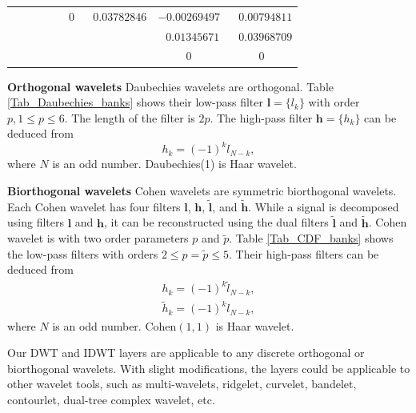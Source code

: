 \begin{table}
\begin{center}
{\begin{tabular}{c|cc|cc|cc|cc}
			&              &                      &              &                      &       $0$       &   $~~~0.03782846$    &  $-0.00269497$  &   $~~~0.00794811$    \\
			&              &                      &              &                      &                 &                      & $~~~0.01345671$ &   $~~~0.03968709$    \\
			&              &                      &              &                      &                 &                      &       $0$       &         $0$          \\ \hline
	\end{tabular}}
\end{center}
\end{table}
\textbf{Orthogonal wavelets}\label{APP_ortho_wavelet}\quad
Daubechies wavelets are orthogonal.
Table \ref{Tab_Daubechies_banks} shows their low-pass filter $\textbf{l} = \{l_k\}$ with order $p, 1\leq p\leq6$.
The length of the filter is $2p$.
The high-pass filter $\textbf{h} = \{h_k\}$ can be deduced from
\begin{equation}\label{eq_high_pass_bank}
h_k = (-1)^k l_{N-k},
\end{equation}
where $N$ is an odd number.
Daubechies(1) is Haar wavelet.

\textbf{Biorthogonal wavelets}\label{APP_bior_wavelet}\quad
Cohen wavelets are symmetric biorthogonal wavelets.
Each Cohen wavelet has four filters $\textbf{l}$, $\textbf{h}$, $\tilde{\textbf{l}}$, and $\tilde{\textbf{h}}$.
While a signal is decomposed using filters $\textbf{l}$ and $\textbf{h}$,
it can be reconstructed using the dual filters $\tilde{\textbf{l}}$ and $\tilde{\textbf{h}}$.
Cohen wavelet is with two order parameters $p$ and $\tilde{p}$.
Table \ref{Tab_CDF_banks} shows the low-pass filters with orders $2\leq p = \tilde{p}\leq5$.
Their high-pass filters can be deduced from
\begin{eqnarray}\label{eq_high_pass_bank_bior}
&h_k = (-1)^k \tilde{l}_{N-k},&\\
&\tilde{h}_k = (-1)^k l_{N-k},&
\end{eqnarray}
where $N$ is an odd number.
Cohen$(1,1)$ is Haar wavelet.

Our DWT and IDWT layers are applicable to any discrete orthogonal or biorthogonal wavelets.
With slight modifications, the layers could be applicable to other wavelet tools, 
such as multi-wavelets, ridgelet, curvelet, bandelet, contourlet, dual-tree complex wavelet, etc.

